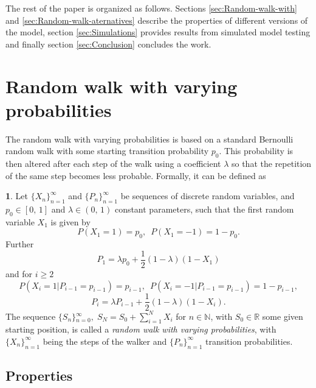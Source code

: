 \documentclass{amsart}
\theoremstyle{definition}
\newtheorem{defn}[thm]{\protect\definitionname}
\theoremstyle{plain}
\theoremstyle{plain}
\numberwithin{equation}{section}
\providecommand{\definitionname}{Definition}
\begin{document}
The rest of the paper is organized as follows. Sections \ref{sec:Random-walk-with}
and \ref{sec:Random-walk-aternatives} describe the properties of
different versions of the model, section \ref{sec:Simulations} provides
results from simulated model testing and finally section \ref{sec:Conclusion}
concludes the work.

\section{Random walk with varying probabilities\label{sec:Random-walk-with}}

The random walk with varying probabilities is based on a standard
Bernoulli random walk \cite{feller1957introduction} with some starting
transition probability $p_{0}$. This probability is then altered
after each step of the walk using a coefficient $\lambda$ so that
the repetition of the same step becomes less probable. Formally, it
can be defined as
\begin{defn}
\label{success_punished}Let ${\{X_{n}\}}_{n=1}^{\infty}$ and ${\{P_{n}\}}_{n=1}^{\infty}$
be sequences of discrete random variables, and $p_{0}\in[0,\,1]$
and $\lambda\in(0,\,1)$ constant parameters, such that the first
random variable $X_{1}$ is given by
\[
P(X_{1}=1)=p_{0},\,\,\,
P(X_{1}=-1)=1-p_{0}.
\]
Further 
\begin{equation}
P_{1}=\lambda p_{0}+\frac{1}{2}(1-\lambda)(1-X_{1})\label{eq:P!1_def}
\end{equation}
and for $i\geq2$
\[
P(X_{i}=1|P_{i-1}=p_{i-1})=p_{i-1},\,\,\,
P(X_{i}=-1|P_{i-1}=p_{i-1})=1-p_{i-1},
\]
\begin{equation}
P_{i}=\lambda P_{i-1}+\frac{1}{2}(1-\lambda)(1-X_{i}).\label{eq:Pi_def}
\end{equation}
The sequence ${\{S_{n}\}}{}_{n=0}^{\infty},\;S_{N}=S_{0}+\sum_{i=1}^{N}X_{i}$
for $n\in\mathbb{N}$, with $S_{0}\in\mathbb{R}$ some given starting
position, is called a \emph{random walk with varying probabilities},
with ${\{X_{n}\}}_{n=1}^{\infty}$ being the steps of the walker and
${\{P_{n}\}}_{n=1}^{\infty}$ transition probabilities.
\end{defn}




\subsection{Properties}
\end{document}
